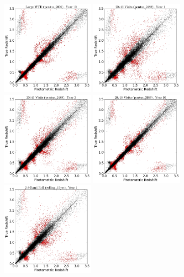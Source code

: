 \begin{figure}
\begin{center}
\includegraphics[width=4.5cm,trim={0cm 0cm 0cm 0cm},clip]{figures/tzpz_pontus2002_10.png}
\includegraphics[width=4.5cm,trim={0cm 0cm 0cm 0cm},clip]{figures/tzpz_pontus2489_1.png}
\includegraphics[width=4.5cm,trim={0cm 0cm 0cm 0cm},clip]{figures/tzpz_pontus2489_3.png}
\includegraphics[width=4.5cm,trim={0cm 0cm 0cm 0cm},clip]{figures/tzpz_pontus2489_10.png}
\includegraphics[width=4.5cm,trim={0cm 0cm 0cm 0cm},clip]{figures/tzpz_rolling10yrs_1.png}

\end{center}
\end{figure}
